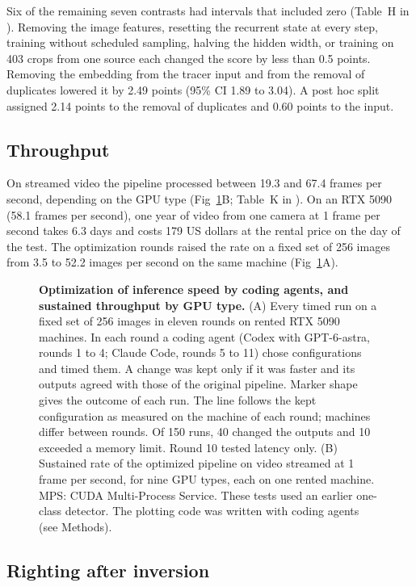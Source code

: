 Six of the remaining seven contrasts had intervals that included zero (Table~H in ).
Removing the image features, resetting the recurrent state at every step, training without scheduled sampling, halving the hidden width, or training on 403 crops from one source each changed the score by less than 0.5 points.
Removing the embedding from the tracer input and from the removal of duplicates lowered it by 2.49 points (95\% CI 1.89 to 3.04).
A post hoc split assigned 2.14 points to the removal of duplicates and 0.60 points to the input.

\subsection*{Throughput}

On streamed video the pipeline processed between 19.3 and 67.4 frames per second, depending on the GPU type (Fig~\ref{fig:throughput}B; Table~K in ).
On an RTX 5090 (58.1 frames per second), one year of video from one camera at 1 frame per second takes 6.3 days and costs 179 US dollars at the rental price on the day of the test.
The optimization rounds raised the rate on a fixed set of 256 images from 3.5 to 52.2 images per second on the same machine (Fig~\ref{fig:throughput}A).

\begin{figure}[!ht]
\caption{{\bf Optimization of inference speed by coding agents, and sustained throughput by GPU type.}
(A) Every timed run on a fixed set of 256 images in eleven rounds on rented RTX 5090 machines. In each round a coding agent (Codex with GPT-6-astra, rounds 1 to 4; Claude Code, rounds 5 to 11) chose configurations and timed them. A change was kept only if it was faster and its outputs agreed with those of the original pipeline. Marker shape gives the outcome of each run. The line follows the kept configuration as measured on the machine of each round; machines differ between rounds. Of 150 runs, 40 changed the outputs and 10 exceeded a memory limit. Round 10 tested latency only.
(B) Sustained rate of the optimized pipeline on video streamed at 1 frame per second, for nine GPU types, each on one rented machine. MPS: CUDA Multi-Process Service. These tests used an earlier one-class detector. The plotting code was written with coding agents (see Methods).}
\label{fig:throughput}
\end{figure}

\subsection*{Righting after inversion}

